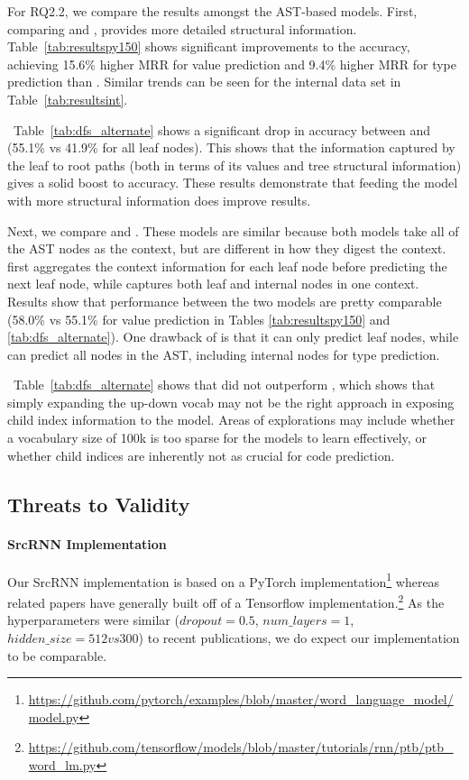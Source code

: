 \documentclass[nonacm, sigconf]{acmart}
\newcommand{\tabref}[1]{Table~\ref{#1}}
\begin{document}
For RQ2.2, we compare the results amongst the AST-based models. 
First, comparing \DFS and \TreeRel, \TreeRel provides more detailed structural information. \tabref{tab:resultspy150} shows significant improvements to the accuracy, achieving 15.6\% higher MRR for value prediction and 9.4\% higher MRR for type prediction than \DFS. Similar trends can be seen for the internal data set in \tabref{tab:resultsint}. 

~\tabref{tab:dfs_alternate} shows a significant drop in accuracy between \RootPath and \LeafTokens (55.1\% vs 41.9\% for all leaf nodes). This shows that the information captured by the leaf to root paths (both in terms of its values and tree structural information) gives a solid boost to accuracy. These results demonstrate that feeding the model with more structural information does improve results.

Next, we compare \RootPath and \DFS. These models are similar because both models take all of the AST nodes as the context, but are different in how they digest the context. \RootPath first aggregates the context information for each leaf node before predicting the next leaf node, while \DFS captures both leaf and internal nodes in one context. Results show that performance between the two models are pretty comparable (58.0\% vs 55.1\% for value prediction in Tables \ref{tab:resultspy150} and \ref{tab:dfs_alternate}). One drawback of \RootPath is that it can only predict leaf nodes, while \DFS  can predict all nodes in the AST, including internal nodes for type prediction.

~\tabref{tab:dfs_alternate} shows that \TreeReli did not outperform \TreeRel, which shows that simply expanding the up-down vocab may not be the right approach in exposing child index information to the model. Areas of explorations may include whether a vocabulary size of 100k is too sparse for the models to learn effectively, or whether child indices are inherently not as crucial for code prediction.
 
\subsection{Threats to Validity}
\label{sec:threats}

\paragraph{SrcRNN Implementation}
Our SrcRNN implementation is based on a PyTorch implementation\footnote{ \url{https://github.com/pytorch/examples/blob/master/word\_language\_model/model.py}} whereas related papers have generally built off of a Tensorflow implementation.\footnote{\url{https://github.com/tensorflow/models/blob/master/tutorials/rnn/ptb/ptb\_word\_lm.py}}  As the hyperparameters were similar ($dropout = 0.5$, $num\_layers = 1$, $hidden\_size = 512 vs 300$) to recent publications, we do expect our implementation to be comparable.  
\end{document}
